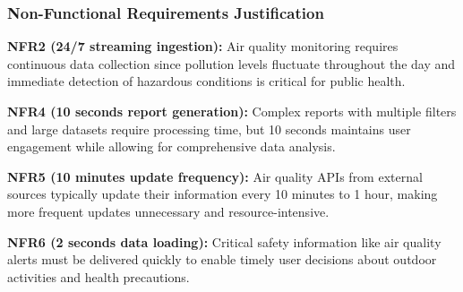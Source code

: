 \subsubsection*{Non-Functional Requirements Justification}

\textbf{NFR2 (24/7 streaming ingestion):} Air quality monitoring requires continuous data collection since pollution levels fluctuate throughout the day and immediate detection of hazardous conditions is critical for public health.

\textbf{NFR4 (10 seconds report generation):} Complex reports with multiple filters and large datasets require processing time, but 10 seconds maintains user engagement while allowing for comprehensive data analysis.

\textbf{NFR5 (10 minutes update frequency):} Air quality APIs from external sources typically update their information every 10 minutes to 1 hour, making more frequent updates unnecessary and resource-intensive.

\textbf{NFR6 (2 seconds data loading):} Critical safety information like air quality alerts must be delivered quickly to enable timely user decisions about outdoor activities and health precautions.

\newpage